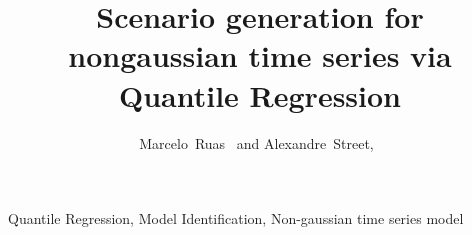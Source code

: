 \documentclass[a4paper]{IEEEtran}
\begin{document}
\title{Scenario generation for nongaussian time series via Quantile Regression
}

\author{Marcelo~Ruas~%
	and Alexandre~Street,~	
	
	
}

\maketitle



\begin{IEEEkeywords}
	Quantile Regression, Model Identification, Non-gaussian time series model
\end{IEEEkeywords}


\listoftodos





%

%
%

%
%




\end{document}
